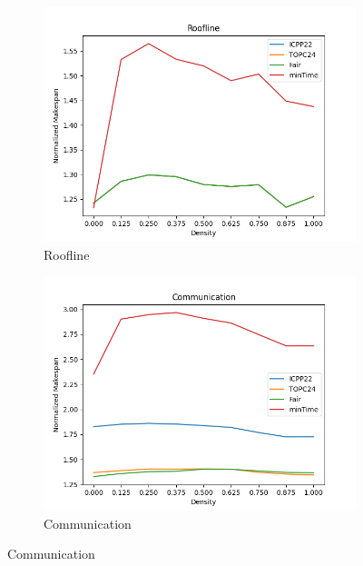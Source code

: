 \documentclass{article}
\begin{document}
\begin{figure}[htbp]
\centering
\begin{subfigure}[b]{0.32\textwidth}\includegraphics[width=\textwidth]{Results/Density/Density_Roofline}\caption{Roofline}\label{fig:lines_figures_Density_Roofline}\end{subfigure}
\hfill
\begin{subfigure}[b]{0.32\textwidth}\includegraphics[width=\textwidth]{Results/Density/Density_Communication}\caption{Communication}\label{fig:lines_figures_Density_Communication}\end{subfigure}
\hfill

\end{figure}
\end{document}

